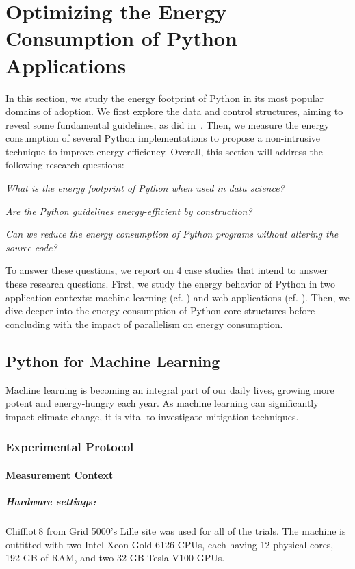 \section{Optimizing the Energy Consumption of Python Applications}\label{python:sec_insights}
In this section, we study the energy footprint of Python in its most popular domains of adoption.
We first explore the data and control structures, aiming to reveal some fundamental guidelines, as \citeauthor{hasan_energy_2016} did in~\cite{hasan_energy_2016}.
Then, we measure the energy consumption of several Python implementations to propose a non-intrusive technique to improve energy efficiency.
Overall, this section will address the following research questions:
\begin{compactenum}[\indent\bf RQ\,1:]
    \item \emph{What is the energy footprint of Python when used in data science?}
    \item \emph{Are the Python guidelines energy-efficient by construction?}
    \item \emph{Can we reduce the energy consumption of Python programs without altering the source code?}
\end{compactenum}

To answer these questions, we report on 4 case studies that intend to answer these research questions.
First, we study the energy behavior of Python in two application contexts: machine learning (cf. ) and web applications (cf. ).
Then, we dive deeper into the energy consumption of Python core structures before concluding with the impact of parallelism on energy consumption.

\subsection{Python for Machine Learning}\label{sec:ml}
Machine learning is becoming an integral part of our daily lives, growing more potent and energy-hungry each year.
As machine learning can significantly impact climate change, it is vital to investigate mitigation techniques.

\subsubsection{Experimental Protocol}
\paragraph{Measurement Context}
\subparagraph{Hardware settings:}
Chifflot\,8 from Grid 5000's Lille site was used for all of the trials.
The machine is outfitted with two Intel Xeon Gold 6126 CPUs, each having 12 physical cores, 192 GB of RAM, and two 32 GB Tesla V100 GPUs.

